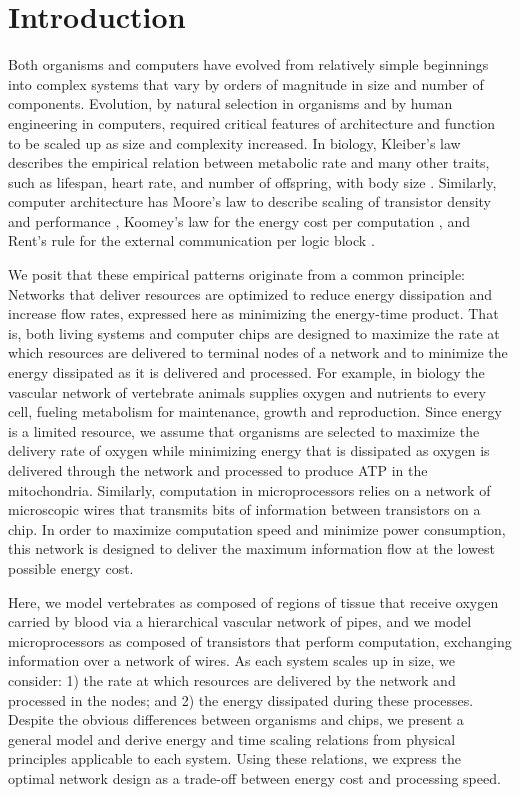 \documentclass[12pt]{article}
\begin{document}
\newpage

\section{Introduction}
\label{sec:intro}

Both organisms and computers have evolved from relatively simple beginnings
into complex systems that vary by orders of magnitude in size and number of
components. Evolution, by natural selection in organisms and by human
engineering in computers, required critical features of architecture and
function to be scaled up as size and complexity increased. In biology,
Kleiber's law describes the empirical relation between metabolic rate and many
other traits, such as lifespan, heart rate, and number of offspring, with body
size \cite{kleiber47}.  Similarly, computer architecture has Moore's law to
describe scaling of transistor density and performance \cite{moore98}, Koomey's
law for the energy cost per computation \cite{koomey11}, and Rent's rule for
the external communication per logic block \cite{christie00}.

We posit that these empirical patterns originate from a common principle:
Networks that deliver resources are optimized to reduce energy dissipation and
increase flow rates, expressed here as minimizing the energy-time product. That
is, both living systems and computer chips are designed to maximize the rate at
which resources are delivered to terminal nodes of a network and to minimize
the energy dissipated as it is delivered and processed.  For example, in biology the vascular network of vertebrate
animals supplies oxygen and nutrients to every cell, fueling metabolism for
maintenance, growth and reproduction.  Since energy is a limited resource, we
assume that organisms are selected to maximize the delivery rate of oxygen while minimizing energy that is dissipated as oxygen is delivered through the network \cite{west97} and processed to produce ATP in the mitochondria. Similarly, computation in microprocessors relies on a
network of microscopic wires that transmits bits of information between
transistors on a chip.  In order to maximize computation speed and minimize
power consumption, this network is designed to deliver the maximum information
flow at the lowest possible energy cost.

Here, we model vertebrates as composed of regions of tissue that receive oxygen
carried by blood via a hierarchical vascular network of pipes, and we model
microprocessors as composed of transistors that perform computation, exchanging
information over a network of wires.  As each system scales up in size,
we consider: 1) the rate at which resources are delivered by the network and
processed in the nodes; and 2) the energy dissipated during these processes.
Despite the obvious differences between organisms and chips, we present a
general model and derive energy and time scaling relations from physical
principles applicable to each system. Using these relations, we express the
optimal network design as a trade-off between energy cost and processing speed. 
\end{document}
